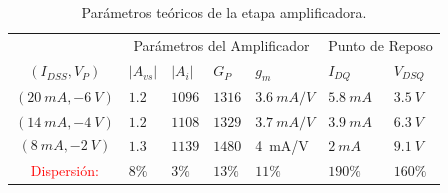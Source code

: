         \begin{table}[h]
        \centering
        \begin{tabularx}{1\textwidth}{XXXXXXXX}
        \hline
        \multicolumn{2}{c}{}				& \multicolumn{4}{c}{Parámetros del Amplificador}						& \multicolumn{2}{c}{Punto de Reposo} \\
        									\cmidrule(r){3-6}														\cmidrule(r){7-8}
        \multicolumn{2}{c}{$(I_{DSS},V_{P})$}& $|A_{vs}|$  		& $|A_{i}|$ 		& $G_P$ 			& $g_m$ 		& $I_{DQ}$ 			& $V_{DSQ}$			\\
        \cmidrule(r){1-2}  									\cmidrule(r){3-3} \cmidrule(r){4-4} 	\cmidrule(r){5-5} 	\cmidrule(r){6-6} \cmidrule(r){7-7} 	\cmidrule(r){8-8}
        \multicolumn{2}{c}{$(20\ mA,-6\ V)$}& $1.2$	& $1096$	& $1316$ & $3.6\ mA/V$ & $5.8\ mA$& $3.5\ V$\\
        \hline
        \multicolumn{2}{c}{$(14\ mA,-4\ V)$}& $1.2$	& $1108$	& $1329$ & $3.7\ mA/V$& $3.9\ mA$ & $6.3\ V$\\
        \hline
        \multicolumn{2}{c}{$$(8\ mA,-2\ V)$$}&$1.3$	& $1139$	& $1480$ & 4\ mA/V & $2\ mA$ & $9.1\ V$ \\
        \hline
        \hline
        \multicolumn{2}{c}{\textcolor{red}{Dispersión:}} & $8\%$ & $3\%$ & $13\%$ & $11\%$ & $190\%$ & $160\% $\\
        \hline
        \end{tabularx}
        \caption{Parámetros teóricos de la etapa amplificadora.}
        \label{tab:dispersion}
        \end{table}

